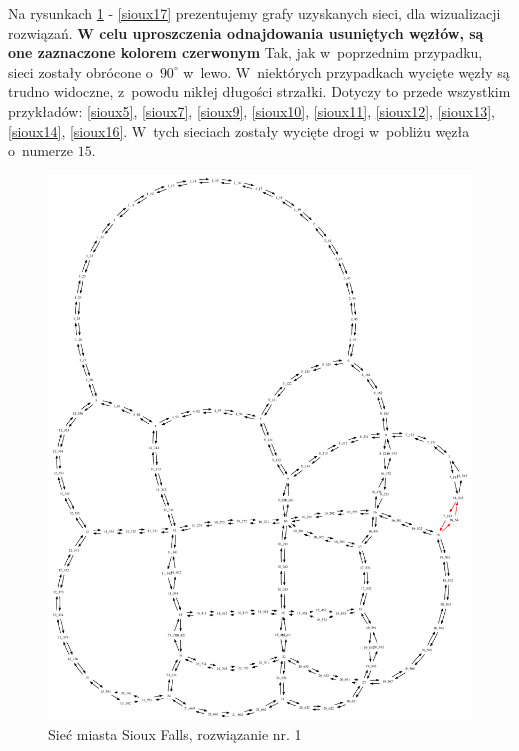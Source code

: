 \documentclass[twoside,12pt]{report}
\begin{document}
\newpage
Na rysunkach \ref{sioux1} - \ref{sioux17} prezentujemy grafy uzyskanych sieci, dla wizualizacji rozwiązań. \textbf{W celu uproszczenia odnajdowania usuniętych węzłów, są one zaznaczone kolorem czerwonym} Tak, jak w~poprzednim przypadku, sieci zostały obrócone o~$90^{\circ}$ w~lewo. W~niektórych przypadkach wycięte węzły są trudno widoczne, z~powodu nikłej długości strzałki. Dotyczy to przede wszystkim przykładów: \ref{sioux5}, \ref{sioux7}, \ref{sioux9}, \ref{sioux10}, \ref{sioux11}, \ref{sioux12}, \ref{sioux13}, \ref{sioux14}, \ref{sioux16}. W~tych sieciach zostały wycięte drogi w~pobliżu węzła o~numerze $ 15$.

\begin{figure}[ht]
\centering
\includegraphics[totalheight=0.580\textheight, angle=90]{img/sioux-out/1/network2}
\caption{Sieć miasta Sioux Falls, rozwiązanie nr. 1}
\label{sioux1}
\end{figure}
\end{document}
